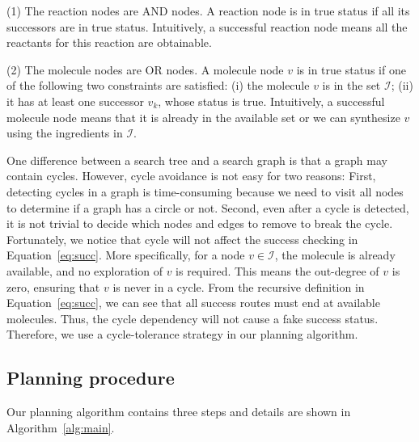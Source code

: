 \documentclass[sigconf]{acmart}
\begin{document}
(1) The reaction nodes are AND nodes. A reaction node is in true status if all its successors are in true status. Intuitively, a successful reaction node means all the reactants for this reaction are obtainable.

(2) The molecule nodes are OR nodes. A molecule node $v$ is in true status if one of the following two constraints are satisfied: (i) the molecule $v$ is in the set $\mathcal{I}$; (ii) it has at least one successor $v_k$, whose status is true. Intuitively, a successful molecule node means that it is already in the available set or we can synthesize $v$ using the ingredients in $\mathcal{I}$.

One difference between a search tree and a search graph is that a graph may contain cycles.
However, cycle avoidance is not easy for two reasons:
First, detecting cycles in a graph is time-consuming because we need to visit all nodes to determine if a graph has a circle or not.
Second, even after a cycle is detected, it is not trivial to decide which nodes and edges to remove to break the cycle.
Fortunately, we notice that cycle will not affect the success checking in Equation~\eqref{eq:succ}.
More specifically, for a node $v \in \mathcal{I}$, the molecule is already available, and no exploration of $v$ is required.
This means the out-degree of $v$ is zero, ensuring that $v$ is never in a cycle.
From the recursive definition in Equation~\eqref{eq:succ}, we can see that all success routes must end at available molecules.
Thus, the cycle dependency will not cause a fake success status.
Therefore, we use a cycle-tolerance strategy in our planning algorithm. 

\subsection{Planning procedure}
Our planning algorithm contains three steps and details are shown in Algorithm~\ref{alg:main}.
\end{document}
